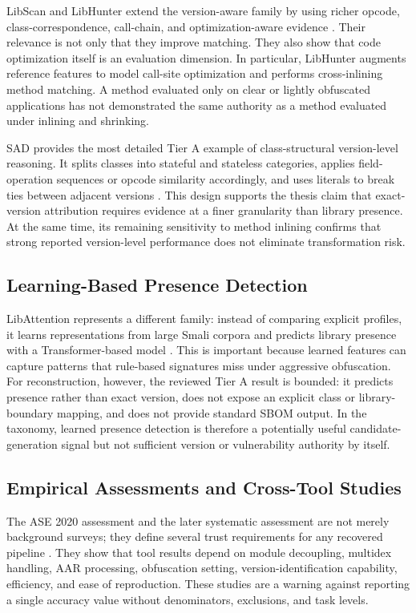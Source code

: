 LibScan and LibHunter extend the version-aware family by using richer opcode,
class-correspondence, call-chain, and optimization-aware evidence
\cite{wu2023libscan,xie2024libhunter}. Their relevance is not only that they
improve matching. They also show that code optimization itself is an
evaluation dimension. In particular, LibHunter augments reference features to
model call-site optimization and performs cross-inlining method matching. A
method evaluated only on clear or lightly obfuscated applications has not
demonstrated the same authority as a method evaluated under inlining and
shrinking.

SAD provides the most detailed Tier A example of class-structural
version-level reasoning. It splits classes into stateful and stateless
categories, applies field-operation sequences or opcode similarity
accordingly, and uses literals to break ties between adjacent versions
\cite{zhou2025sad}. This design supports the thesis claim that exact-version
attribution requires evidence at a finer granularity than library presence.
At the same time, its remaining sensitivity to method inlining confirms that
strong reported version-level performance does not eliminate transformation
risk.

\subsection{Learning-Based Presence Detection}

LibAttention represents a different family: instead of comparing explicit
profiles, it learns representations from large Smali corpora and predicts
library presence with a Transformer-based model
\cite{pan2025libattention}. This is important because learned features can
capture patterns that rule-based signatures miss under aggressive
obfuscation. For \SBOM reconstruction, however, the reviewed Tier A result is
bounded: it predicts presence rather than exact version, does not expose an
explicit class or library-boundary mapping, and does not provide standard SBOM
output. In the taxonomy, learned presence detection is therefore a potentially
useful candidate-generation signal but not sufficient version or vulnerability
authority by itself.

\subsection{Empirical Assessments and Cross-Tool Studies}

The ASE 2020 assessment and the later systematic assessment are not merely
background surveys; they define several trust requirements for any recovered
\SBOM pipeline \cite{zhan2020assessment,zhan2021systematic}. They show that
tool results depend on module decoupling, multidex handling, AAR processing,
obfuscation setting, version-identification capability, efficiency, and ease
of reproduction. These studies are a warning against reporting a single
accuracy value without denominators, exclusions, and task levels.


